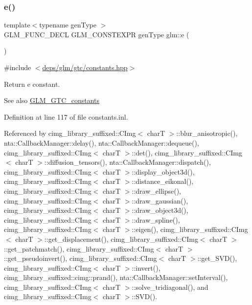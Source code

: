 \subsubsection{\texorpdfstring{e()}{e()}}
{\footnotesize\ttfamily template$<$typename gen\+Type $>$ \\
G\+L\+M\+\_\+\+F\+U\+N\+C\+\_\+\+D\+E\+CL G\+L\+M\+\_\+\+C\+O\+N\+S\+T\+E\+X\+PR gen\+Type glm\+::e (\begin{DoxyParamCaption}{ }\end{DoxyParamCaption})}



{\ttfamily \#include $<$\hyperlink{constants_8hpp}{deps/glm/gtc/constants.\+hpp}$>$}

Return e constant. \begin{DoxySeeAlso}{See also}
\hyperlink{group__gtc__constants}{G\+L\+M\+\_\+\+G\+T\+C\+\_\+constants} 
\end{DoxySeeAlso}


Definition at line 117 of file constants.\+inl.



Referenced by cimg\+\_\+library\+\_\+suffixed\+::\+C\+Img$<$ char\+T $>$\+::blur\+\_\+anisotropic(), nta\+::\+Callback\+Manager\+::delay(), nta\+::\+Callback\+Manager\+::dequeue(), cimg\+\_\+library\+\_\+suffixed\+::\+C\+Img$<$ char\+T $>$\+::det(), cimg\+\_\+library\+\_\+suffixed\+::\+C\+Img$<$ char\+T $>$\+::diffusion\+\_\+tensors(), nta\+::\+Callback\+Manager\+::dispatch(), cimg\+\_\+library\+\_\+suffixed\+::\+C\+Img$<$ char\+T $>$\+::display\+\_\+object3d(), cimg\+\_\+library\+\_\+suffixed\+::\+C\+Img$<$ char\+T $>$\+::distance\+\_\+eikonal(), cimg\+\_\+library\+\_\+suffixed\+::\+C\+Img$<$ char\+T $>$\+::draw\+\_\+ellipse(), cimg\+\_\+library\+\_\+suffixed\+::\+C\+Img$<$ char\+T $>$\+::draw\+\_\+gaussian(), cimg\+\_\+library\+\_\+suffixed\+::\+C\+Img$<$ char\+T $>$\+::draw\+\_\+object3d(), cimg\+\_\+library\+\_\+suffixed\+::\+C\+Img$<$ char\+T $>$\+::draw\+\_\+spline(), cimg\+\_\+library\+\_\+suffixed\+::\+C\+Img$<$ char\+T $>$\+::eigen(), cimg\+\_\+library\+\_\+suffixed\+::\+C\+Img$<$ char\+T $>$\+::get\+\_\+displacement(), cimg\+\_\+library\+\_\+suffixed\+::\+C\+Img$<$ char\+T $>$\+::get\+\_\+patchmatch(), cimg\+\_\+library\+\_\+suffixed\+::\+C\+Img$<$ char\+T $>$\+::get\+\_\+pseudoinvert(), cimg\+\_\+library\+\_\+suffixed\+::\+C\+Img$<$ char\+T $>$\+::get\+\_\+\+S\+V\+D(), cimg\+\_\+library\+\_\+suffixed\+::\+C\+Img$<$ char\+T $>$\+::invert(), cimg\+\_\+library\+\_\+suffixed\+::cimg\+::prand(), nta\+::\+Callback\+Manager\+::set\+Interval(), cimg\+\_\+library\+\_\+suffixed\+::\+C\+Img$<$ char\+T $>$\+::solve\+\_\+tridiagonal(), and cimg\+\_\+library\+\_\+suffixed\+::\+C\+Img$<$ char\+T $>$\+::\+S\+V\+D().

